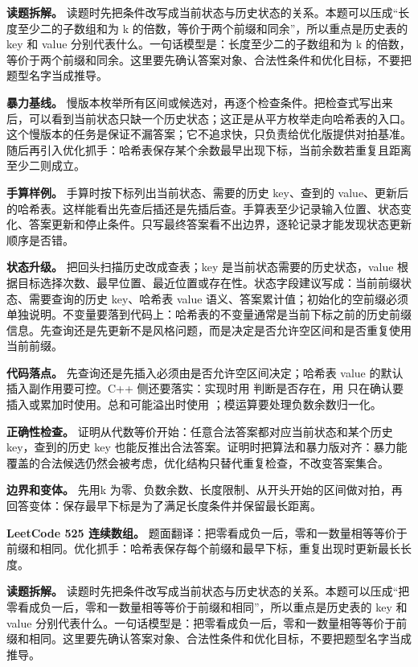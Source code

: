 \textbf{读题拆解。} 读题时先把条件改写成当前状态与历史状态的关系。本题可以压成“长度至少二的子数组和为 k 的倍数，等价于两个前缀和同余”，所以重点是历史表的 key 和 value 分别代表什么。一句话模型是：长度至少二的子数组和为 k 的倍数，等价于两个前缀和同余。这里要先确认答案对象、合法性条件和优化目标，不要把题型名字当成推导。

\textbf{暴力基线。} 慢版本枚举所有区间或候选对，再逐个检查条件。把检查式写出来后，可以看到当前状态只缺一个历史状态；这正是从平方枚举走向哈希表的入口。这个慢版本的任务是保证不漏答案；它不追求快，只负责给优化版提供对拍基准。随后再引入优化抓手：哈希表保存某个余数最早出现下标，当前余数若重复且距离至少二则成立。

\textbf{手算样例。} 手算时按下标列出当前状态、需要的历史 key、查到的 value、更新后的哈希表。这样能看出先查后插还是先插后查。手算表至少记录输入位置、状态变化、答案更新和停止条件。只写最终答案看不出边界，逐轮记录才能发现状态更新顺序是否错。

\textbf{状态升级。} 把回头扫描历史改成查表；key 是当前状态需要的历史状态，value 根据目标选择次数、最早位置、最近位置或存在性。状态字段建议写成：当前前缀状态、需要查询的历史 key、哈希表 value 语义、答案累计值；初始化的空前缀必须单独说明。不变量要落到代码上：哈希表的不变量通常是当前下标之前的历史前缀信息。先查询还是先更新不是风格问题，而是决定是否允许空区间和是否重复使用当前前缀。

\textbf{代码落点。} 先查询还是先插入必须由是否允许空区间决定；哈希表 value 的默认插入副作用要可控。C++ 侧还要落实：实现时用  判断是否存在，用  只在确认要插入或累加时使用。总和可能溢出时使用 ；模运算要处理负数余数归一化。

\textbf{正确性检查。} 证明从代数等价开始：任意合法答案都对应当前状态和某个历史 key，查到的历史 key 也能反推出合法答案。证明时把算法和暴力版对齐：暴力能覆盖的合法候选仍然会被考虑，优化结构只替代重复检查，不改变答案集合。

\textbf{边界和变体。} 先用k 为零、负数余数、长度限制、从开头开始的区间做对拍，再回答变体：保存最早下标是为了满足长度条件并保留最长距离。

\noindent\textbf{LeetCode 525 连续数组。} 题面翻译：把零看成负一后，零和一数量相等等价于前缀和相同。优化抓手：哈希表保存每个前缀和最早下标，重复出现时更新最长长度。

\textbf{读题拆解。} 读题时先把条件改写成当前状态与历史状态的关系。本题可以压成“把零看成负一后，零和一数量相等等价于前缀和相同”，所以重点是历史表的 key 和 value 分别代表什么。一句话模型是：把零看成负一后，零和一数量相等等价于前缀和相同。这里要先确认答案对象、合法性条件和优化目标，不要把题型名字当成推导。

